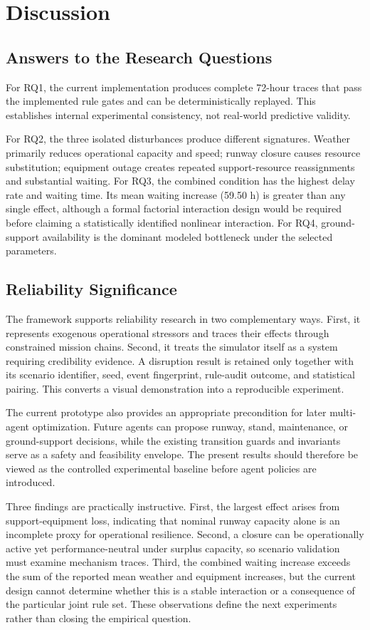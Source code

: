 \documentclass[runningheads]{llncs}
\begin{document}
\section{Discussion}
\subsection{Answers to the Research Questions}
For RQ1, the current implementation produces complete 72-hour traces that pass the implemented rule gates and can be deterministically replayed. This establishes internal experimental consistency, not real-world predictive validity.

For RQ2, the three isolated disturbances produce different signatures. Weather primarily reduces operational capacity and speed; runway closure causes resource substitution; equipment outage creates repeated support-resource reassignments and substantial waiting. For RQ3, the combined condition has the highest delay rate and waiting time. Its mean waiting increase (59.50 h) is greater than any single effect, although a formal factorial interaction design would be required before claiming a statistically identified nonlinear interaction. For RQ4, ground-support availability is the dominant modeled bottleneck under the selected parameters.

\subsection{Reliability Significance}
The framework supports reliability research in two complementary ways. First, it represents exogenous operational stressors and traces their effects through constrained mission chains. Second, it treats the simulator itself as a system requiring credibility evidence. A disruption result is retained only together with its scenario identifier, seed, event fingerprint, rule-audit outcome, and statistical pairing. This converts a visual demonstration into a reproducible experiment.

The current prototype also provides an appropriate precondition for later multi-agent optimization. Future agents can propose runway, stand, maintenance, or ground-support decisions, while the existing transition guards and invariants serve as a safety and feasibility envelope. The present results should therefore be viewed as the controlled experimental baseline before agent policies are introduced.

Three findings are practically instructive. First, the largest effect arises from support-equipment loss, indicating that nominal runway capacity alone is an incomplete proxy for operational resilience. Second, a closure can be operationally active yet performance-neutral under surplus capacity, so scenario validation must examine mechanism traces. Third, the combined waiting increase exceeds the sum of the reported mean weather and equipment increases, but the current design cannot determine whether this is a stable interaction or a consequence of the particular joint rule set. These observations define the next experiments rather than closing the empirical question.
\end{document}
